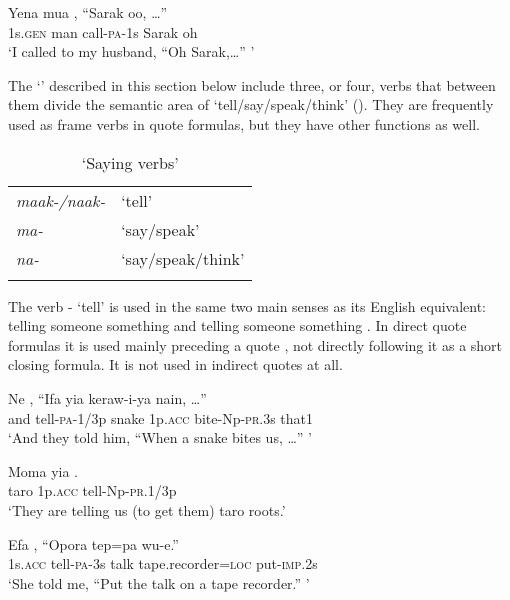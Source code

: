 \ea%
\label{ex:3:x311}
\gll Yena mua , ``Sarak oo, {\dots}'' \\
1s.\textsc{gen} man call-\textsc{pa}-1s Sarak oh \\
\glt`I called to my husband, ``Oh Sarak,{\dots}'' '
\z

The `' described in this section below include three, or four, verbs that between them divide the semantic area of `tell/say/speak/think' (). They are frequently used as frame verbs in quote formulas, but they have other functions as well.

\begin{table}
\caption{`Saying verbs'}
\label{tab:3:sayingverbs}
 
\begin{tabular}{>{\itshape}ll}
\mytoprule
maak-/naak- &`tell'\\
ma- &`say/speak'\\
na- &`say/speak/think'\\
\mybottomrule
\end{tabular}

\end{table}

The verb - `tell' is used in the same two main senses as its English equivalent: telling someone  something  and telling someone  something . In direct quote formulas it is used mainly preceding a quote , not directly following it as a short closing formula. It is not used in indirect quotes at all.

\ea%
\label{ex:3:x312}
\gll Ne , ``Ifa yia keraw-i-ya nain, {\dots''} \\
and tell-\textsc{pa}-1/3p snake 1p.\textsc{acc} bite-Np-\textsc{pr}.3s that1\\
\glt`And they told him, ``When a snake bites us, {\dots}'' '
\z

\ea%
\label{ex:3:x313}
\gll Moma yia . \\
taro 1p.\textsc{acc} tell-Np-\textsc{pr}.1/3p \\
\glt`They are telling us (to get them) taro roots.'
\z

\ea%
\label{ex:3:x314}
\gll Efa ,  ``Opora tep=pa wu-e.'' \\
1s.\textsc{acc}  tell-\textsc{pa}-3s talk tape.recorder=\textsc{loc} put-\textsc{imp}.2s\\
\glt`She told me, ``Put the talk on a tape recorder.'' '
\z

